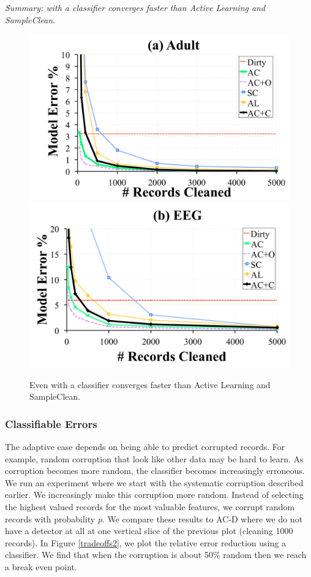 \vspace{0.25em}

\noindent \emph{Summary: \sys with a classifier converges faster than Active Learning and SampleClean.}

\begin{figure}[t]
\centering
 \includegraphics[width=0.49\columnwidth]{exp/exp11a.pdf}
 \includegraphics[width=0.49\columnwidth]{exp/exp11b.pdf}
 \caption{Even with a classifier \sys converges faster than Active Learning and SampleClean. \label{pred-perf}}\vspace{-1.0em}
\end{figure}


\subsubsection{Classifiable Errors}
The adaptive case depends on being able to predict corrupted records.
For example, random corruption that look like other data may be hard to learn.
As corruption becomes more random, the classifier becomes increasingly erroneous.
We run an experiment where we start with the systematic corruption described earlier.
We increasingly make this corruption more random.
Instead of selecting the highest valued records for the most valuable features, we corrupt random records with probability $p$. 
We compare these results to AC-D where we do not have a detector at all at one vertical slice of the previous plot (cleaning 1000 records).
In Figure \ref{tradeoffs2}, we plot the relative error reduction using a classifier.
We find that when the corruption is about 50\% random then we reach a break even point.

